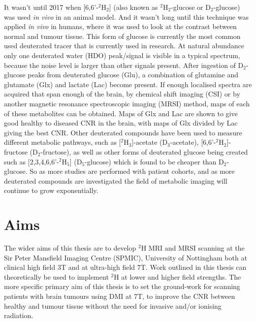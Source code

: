 \documentclass[class=article, crop=false]{standalone}
\begin{document}
It wasn't until 2017 when [6,6'-$^2$H$_2$] (also known as $^2$H$_2$-glucose or D$_2$-glucose) was used \textit{in vivo} in an animal model\cite{Lu2017QuantitativeSpectroscopy}. And it wasn't long until this technique was applied \textit{in vivo} in humans, where it was used to look at the contrast between normal and tumour tissue\cite{DeFeyter2018DeuteriumVivo}. This form of glucose is currently the most common used deuterated tracer that is currently used in research\cite{DeFeyter2018DeuteriumVivo,DeFeyter2021DeuteriumFuture,Ruhm2022Dynamic9.4T,Roig2022Deuterium7T,deGraaf2020OnImaging}. At natural abundance only one deuterated water (HDO) peak/signal is visible in a typical spectrum, because the noise level is larger than other signals present. After ingestion of D$_2$-glucose peaks from deuterated glucose (Glu), a combination of glutamine and glutamate (Glx) and lactate (Lac) become present. If enough localised spectra are acquired that span enough of the brain, by chemical shift imaging (CSI) or by another magnetic resonance spectroscopic imaging (MRSI) method, maps of each of these metabolites can be obtained. Maps of Glx and Lac are shown to give good healthy to diseased CNR in the brain, with maps of Glx divided by Lac giving the best CNR\cite{DeFeyter2018DeuteriumVivo,Straathof2021DeuteriumBrain}. Other deuterated compounds have been used to measure different metabolic pathways, such as [$^2$H$_3$]-acetate (D$_3$-acetate)\cite{DeFeyter2018DeuteriumVivo,Rich20201HVivo}, [6,6'-$^2$H$_2$]-fructose (D$_2$-fructose)\cite{Zhang202366-2H2Cancer}, as well as other forms of deuterated glucose being created such as [2,3,4,6,6'-$^2$H$_5$] (D$_5$-glucose)\cite{Zou2023AImaging} which is found to be cheaper than D$_2$-glucose. So as more studies are performed with patient cohorts, and as more deuterated compounds are investigated the field of metabolic imaging will continue to grow exponentially. 


\section{Aims}

The wider aims of this thesis are to develop $^2$H MRI and MRSI scanning at the Sir Peter Mansfield Imaging Centre (SPMIC), University of Nottingham both at clinical high field 3T and at ultra-high field 7T. Work outlined in this thesis can theoretically be used to implement $^2$H at lower and higher field strengths. The more specific primary aim of this thesis is to set the ground-work for scanning patients with brain tumours using DMI at 7T, to improve the CNR between healthy and tumour tissue without the need for invasive and/or ionising radiation.
\end{document}

